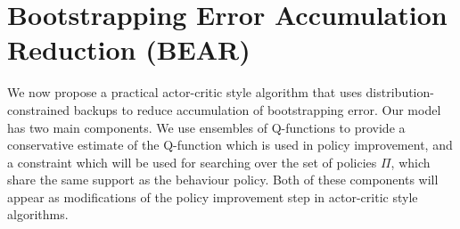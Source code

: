 



\section{Bootstrapping Error Accumulation Reduction (BEAR)}
\label{sec:bear}

We now propose a practical actor-critic style algorithm that uses distribution-constrained backups
to reduce accumulation of bootstrapping error.
Our model has two main components. We use ensembles of Q-functions to provide a conservative estimate of the Q-function which is used in policy improvement, and a constraint which will be used for searching over the set of policies $\Pi$, which share the same support as the behaviour policy. Both of these components will appear as modifications of the policy improvement step in actor-critic style algorithms.

